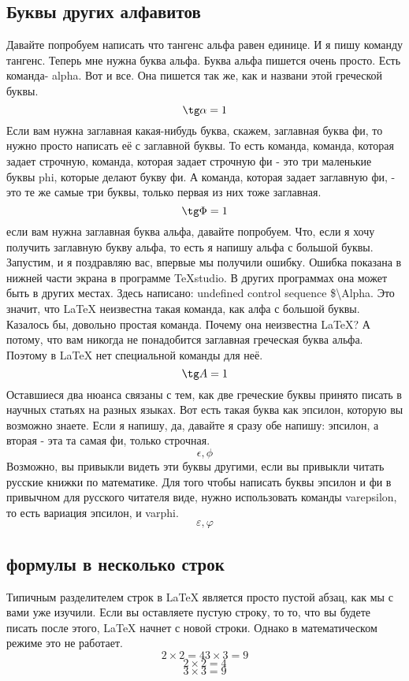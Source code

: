 \documentclass[a4paper,12pt]{article} %
\begin{document}
{\subsection{Буквы других алфавитов}
 Давайте попробуем написать что тангенс
 альфа равен единице. И я пишу команду тангенс. Теперь мне нужна буква альфа. Буква альфа пишется очень просто. Есть команда- alpha. Вот и все. Она пишется так же, как и названи этой
 греческой буквы.
\[\tg \alpha = 1 \]
Если вам нужна заглавная какая-нибудь
буква, скажем, заглавная буква фи, то нужно просто написать её с
заглавной буквы. То есть команда, команда, которая задает
строчную, команда, которая задает строчную фи - это три маленькие буквы
phi, которые делают букву фи. А команда, которая задает заглавную фи, -
это те же самые три буквы, только первая из них
тоже заглавная.
\[\tg \Phi = 1 \]
если вам нужна заглавная буква
альфа, давайте попробуем. Что, если я хочу получить заглавную букву
альфа, то есть я напишу альфа с большой буквы. Запустим, и я поздравляю вас, впервые мы
получили ошибку. Ошибка показана в нижней части экрана
в программе TeXstudio. В других программах она может быть в
других местах. Здесь написано: undefined control
sequence \$\textbackslash Alpha. Это значит, что LaTeX неизвестна такая
команда, как алфа с большой буквы. Казалось бы, довольно простая команда. Почему она неизвестна LaTeX? А потому, что вам никогда не понадобится
заглавная греческая буква альфа. Поэтому в LaTeX нет специальной команды
для неё. 
\[\tg A = 1 \]
Оставшиеся два нюанса связаны с тем, как
две греческие буквы принято писать в научных статьях
на разных языках. Вот есть такая буква как эпсилон, которую
вы возможно знаете. Если я напишу, да, давайте я сразу обе
напишу: эпсилон, а вторая - эта та самая фи, только
строчная.
\[\epsilon, \phi\]
Возможно, вы привыкли видеть эти буквы
другими, если вы привыкли читать русские книжки по
математике. Для того чтобы написать буквы эпсилон и фи
в привычном для русского читателя виде, нужно использовать
команды varepsilon, то есть вариация эпсилон, и varphi. 
\[\varepsilon, \varphi\]
\subsection{формулы в несколько строк}
Типичным разделителем строк в LaTeX является просто пустой абзац, как мы с
вами уже изучили. Если вы оставляете пустую строку, то то, что
вы будете писать после этого, LaTeX начнет с
новой строки. Однако в математическом режиме это не
работает.
\[
2\times2=4
3\times3=9
\]
\[2\times2=4\]
\[3\times3=9\]
}
\end{document}
